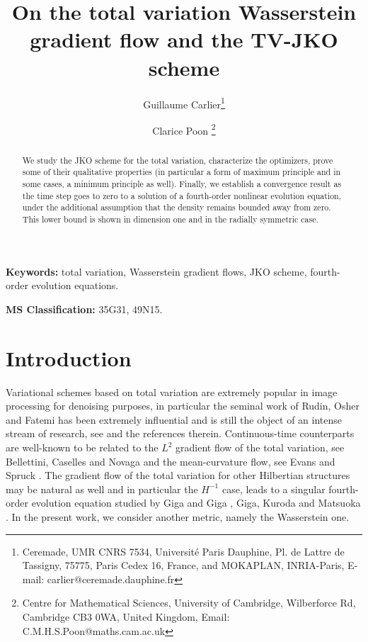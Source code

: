 \documentclass[12pt, a4paper]{article}
\numberwithin{equation}{section}
\theoremstyle{plain}
\theoremstyle{definition}
\theoremstyle{remark}
\begin{document}
\title{On the total variation Wasserstein gradient flow and the TV-JKO scheme} 
\author{Guillaume   {\sc Carlier}\thanks{Ceremade, UMR CNRS 7534,  Universit\'e Paris Dauphine, Pl. de Lattre de Tassigny, 75775, Paris Cedex 16, France, and MOKAPLAN, INRIA-Paris, E-mail: carlier@ceremade.dauphine.fr }     \and 
 Clarice  {\sc Poon }\thanks{Centre for Mathematical Sciences, University of Cambridge, Wilberforce Rd, Cambridge CB3 0WA, United Kingdom, 
  Email: C.M.H.S.Poon@maths.cam.ac.uk}  
}





\maketitle




\begin{abstract}
We study the JKO scheme for the total variation, characterize the optimizers, prove some of their qualitative properties (in particular a form of maximum principle and in some cases, a minimum principle as well).  Finally,  we establish a convergence result as the time step goes to zero to a solution of a fourth-order nonlinear evolution equation, under the additional assumption that the density remains bounded away from zero. This lower bound is shown in dimension one and in the radially symmetric case. 

\end{abstract}


\textbf{Keywords:}  total variation, Wasserstein gradient flows, JKO scheme, fourth-order evolution equations.%


\medskip

\textbf{MS Classification:}  35G31, 49N15. 





\section{Introduction}\label{sec-intro}
 

Variational schemes based on total variation are extremely popular in image processing for denoising purposes, in particular the seminal work of Rudin, Osher and Fatemi \cite{Rof} has been extremely influential and is still the object of an intense stream of research, see \cite{chambolle2016geometric} and the references therein. Continuous-time counterparts are well-known to be related to the $L^2$ gradient flow of the total variation, see Bellettini, Caselles and Novaga \cite{bellettini2002total} and the mean-curvature flow, see Evans and Spruck \cite{evansspruck}. The gradient flow of the total variation for other Hilbertian structures may be natural as well and in particular the $H^{-1}$  case, leads to a singular fourth-order evolution equation studied by Giga  and Giga \cite{giga2010}, Giga, Kuroda and  Matsuoka  \cite{giga2014}. In the present work,  we consider another metric, namely the Wasserstein one.  
\end{document}
